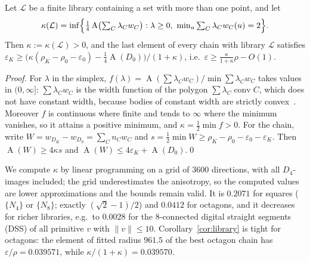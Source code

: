 \documentclass[runningheads]{llncs}
\newcommand{\conv}{\operatorname{conv}}
\newcommand{\A}{\operatorname{A}}
\begin{document}
\begin{corollary}\label{cor:library}
Let $\mathcal L$ be a finite library containing a set with more than one point, and let
\[\kappa(\mathcal L)=\inf\Bigl\{\tfrac14\A\bigl(\textstyle\sum_C\lambda_Cw_C\bigr):\lambda\ge0,\ \min_u\textstyle\sum_C\lambda_Cw_C(u)=2\Bigr\}.\]
Then $\kappa:=\kappa(\mathcal L)>0$, and the last element of every chain with library $\mathcal L$ satisfies $\varepsilon_K\ge\bigl(\kappa(\rho_K-\rho_0-\varepsilon_0)-\frac14\A(D_0)\bigr)/(1+\kappa)$, i.e.\ $\varepsilon\ge\frac{\kappa}{1+\kappa}\rho-O(1)$.
\end{corollary}
\begin{proof}
For $\lambda$ in the simplex, $f(\lambda)=\A(\sum\lambda_Cw_C)/\min\sum\lambda_Cw_C$ takes values in $(0,\infty]$: $\sum\lambda_Cw_C$ is the width function of the polygon $\sum\lambda_C\conv C$, which does not have constant width, because bodies of constant width are strictly convex~\cite{schneider2014}. Moreover $f$ is continuous where finite and tends to $\infty$ where the minimum vanishes, so it attains a positive minimum, and $\kappa=\frac12\min f>0$. For the chain, write $W=w_{D_K}-w_{D_0}=\sum_Cn_Cw_C$ and $s=\frac12\min W\ge\rho_K-\rho_0-\varepsilon_0-\varepsilon_K$. Then $\A(W)\ge4\kappa s$ and $\A(W)\le4\varepsilon_K+\A(D_0)$.\qed
\end{proof}



We compute $\kappa$ by linear programming on a grid of 3600 directions, with all $D_4$-images included; the grid underestimates the anisotropy, so the computed values are lower approximations and the bounds remain valid. It is $0.2071$ for squares ($\{N_4\}$ or $\{N_8\}$; exactly $(\sqrt2-1)/2$) and $0.0412$ for octagons, and it decreases for richer libraries, e.g.\ to $0.0028$ for the 8-connected digital straight segments (DSS) of all primitive $v$ with $\|v\|\le10$. Corollary~\ref{cor:library} is tight for octagons: the element of fitted radius $961.5$ of the best octagon chain has $\varepsilon/\rho=0.039571$, while $\kappa/(1+\kappa)=0.039570$.

\end{document}
